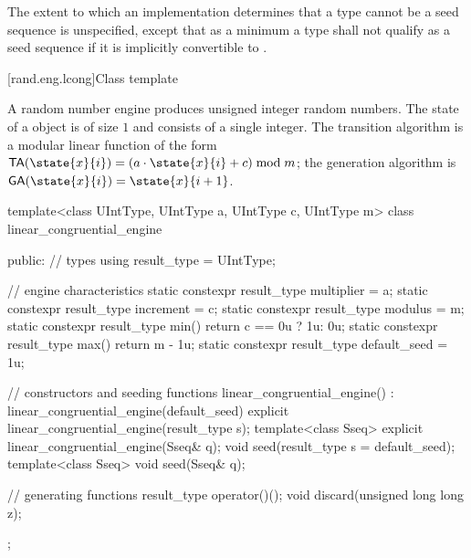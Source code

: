 The extent to which an implementation determines that a type cannot be a seed sequence
is unspecified, except that as a minimum a type shall not qualify as a seed sequence
if it is implicitly convertible to .


[rand.eng.lcong]{Class template }%
%

\pnum
A  random number engine
produces unsigned integer random numbers.
The state%
of a  object 
is of size $1$
and consists of a single integer.
The transition algorithm%
%
is a modular linear function of the form
$\mathsf{TA}(\state{x}{i}) = (a \cdot \state{x}{i} + c) \bmod m$;
the generation algorithm%
%
is $\mathsf{GA}(\state{x}{i}) = \state{x}{i+1}$.

%
\begin{codeblock}
template<class UIntType, UIntType a, UIntType c, UIntType m>
  class linear_congruential_engine {
  public:
    // types
    using result_type = UIntType;

    // engine characteristics
    static constexpr result_type multiplier = a;
    static constexpr result_type increment = c;
    static constexpr result_type modulus = m;
    static constexpr result_type min() { return c == 0u ? 1u: 0u; }
    static constexpr result_type max() { return m - 1u; }
    static constexpr result_type default_seed = 1u;

    // constructors and seeding functions
    linear_congruential_engine() : linear_congruential_engine(default_seed) {}
    explicit linear_congruential_engine(result_type s);
    template<class Sseq> explicit linear_congruential_engine(Sseq& q);
    void seed(result_type s = default_seed);
    template<class Sseq> void seed(Sseq& q);

    // generating functions
    result_type operator()();
    void discard(unsigned long long z);
  };
\end{codeblock}

